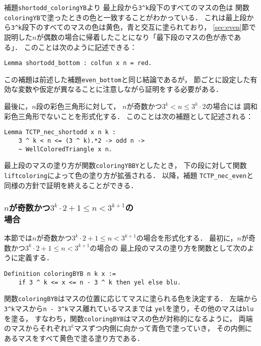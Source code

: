 補題{\tt{shortodd\_coloringYB}}より
最上段から{\tt{3\verb|^|k}}段下のすべてのマスの色は
関数{\tt{coloringYB}}で塗ったときの色と一致することがわかっている．
これは最上段から{\tt{3\verb|^|k}}段下のすべてのマスの色は黄色，青と交互に塗られており，
\ref{sec:even}節で説明した$n$が偶数の場合に帰着したことになり「最下段のマスの色が赤である」．
このことは次のように記述できる：
\begin{lstlisting}[language=Coq]
  Lemma shortodd_bottom : colfun x n = red.
\end{lstlisting}
この補題は前述した補題{\tt{even\_bottom}}と同じ結論であるが，
節ごとに設定した有効な変数や仮定が異なることに注意しながら証明をする必要がある．

最後に，$n$段の彩色三角形に対して，
$n$が奇数かつ$3^{k} < n \leq 3^{k} \cdot 2$の場合には
調和彩色三角形でないことを形式化する．
このことは次の補題として記述される：
\begin{lstlisting}[language=Coq]
  Lemma TCTP_nec_shortodd x n k :
    3 ^ k < n <= (3 ^ k).*2 -> odd n ->
    ~ WellColoredTriangle x n.
\end{lstlisting}
最上段のマスの塗り方が関数{\tt{coloringYBBY}}としたとき，
下の段に対して関数{\tt{liftcoloring}}によって色の塗り方が拡張される．
以降，補題 {\tt{TCTP\_nec\_even}}と同様の方針で証明を終えることができる．

\subsubsection{$n$が奇数かつ$3^{k} \cdot 2 + 1 \leq n < 3^{k+1}$の\\場合}

本節では$n$が奇数かつ$3^{k} \cdot 2 + 1 \leq n < 3^{k+1}$の場合を形式化する．
最初に，$n$が奇数かつ$3^{k} \cdot 2 + 1 \leq n < 3^{k+1}$の場合の
最上段のマスの塗り方を関数として次のように定義する．
\begin{lstlisting}[language=Coq]
  Definition coloringBYB n k x :=
    if 3 ^ k <= x <= n - 3 ^ k then yel else blu.
\end{lstlisting}
関数{\tt{coloringBYB}}はマスの位置に応じてマスに塗られる色を決定する．
左端から{\tt{3\verb|^|k}}マスから{\tt{n - 3\verb|^|k}}マス離れているマスまでは
{\tt{yel}}を塗り，その他のマスは{\tt{blu}}を塗る，
すなわち，関数{\tt{coloringBYB}}はマスの色が対称的になるように，
両端のマスからそれぞれ$3^k$マスずつ内側に向かって青色で塗っていき，
その内側にあるマスをすべて黄色で塗る塗り方である．

